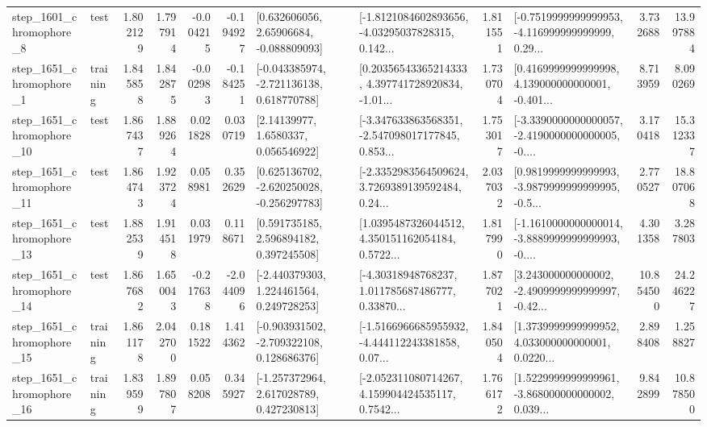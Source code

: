 \begin{tabular}{llrrrrllrlrr}
  step\_1601\_chromophore\_8 &      test &      1.802129 &    1.797914 &     -0.004215 & -0.194927 &     [0.632606056, 2.65906684, -0.088809093] &  [-1.8121084602893656, -4.03295037828315, 0.142... &       1.811551 &  [-0.7519999999999953, -4.116999999999999, 0.29... &            3.732688 &         13.997884 \\
  step\_1651\_chromophore\_1 &  training &      1.845858 &    1.842875 &     -0.002983 & -0.184251 &   [-0.043385974, -2.721136138, 0.618770788] &  [0.20356543365214333, 4.397741728920834, -1.01... &       1.730704 &  [0.4169999999999998, 4.139000000000001, -0.401... &            8.713959 &          8.090269 \\
 step\_1651\_chromophore\_10 &      test &      1.867437 &    1.889264 &      0.021828 &  0.030719 &        [2.14139977, 1.6580337, 0.056546922] &  [-3.347633863568351, -2.547098017177845, 0.853... &       1.753017 &  [-3.3390000000000057, -2.4190000000000005, -0.... &            3.170418 &         15.312337 \\
 step\_1651\_chromophore\_11 &      test &      1.864743 &    1.923724 &      0.058981 &  0.352629 &   [0.625136702, -2.620250028, -0.256297783] &  [-2.3352983564509624, 3.7269389139592484, 0.24... &       2.037032 &  [0.9819999999999993, -3.9879999999999995, -0.5... &            2.770527 &         18.807068 \\
 step\_1651\_chromophore\_13 &      test &      1.882539 &    1.914518 &      0.031979 &  0.118671 &     [0.591735185, 2.596894182, 0.397245508] &  [1.0395487326044512, 4.350151162054184, 0.5722... &       1.817990 &  [-1.1610000000000014, -3.8889999999999993, -0.... &            4.301358 &          3.287803 \\
 step\_1651\_chromophore\_14 &      test &      1.867682 &    1.650043 &     -0.217638 & -2.044096 &    [-2.440379303, 1.224461564, 0.249728253] &  [-4.30318948768237, 1.011785687486777, 0.33870... &       1.877021 &  [3.243000000000002, -2.4909999999999997, -0.42... &           10.854500 &         24.246227 \\
 step\_1651\_chromophore\_15 &  training &      1.861178 &    2.042700 &      0.181522 &  1.414362 &   [-0.903931502, -2.709322108, 0.128686376] &  [-1.5166966685955932, -4.444112243381858, 0.07... &       1.840504 &  [1.3739999999999952, 4.033000000000001, 0.0220... &            2.898408 &          1.258827 \\
 step\_1651\_chromophore\_16 &  training &      1.839599 &    1.897807 &      0.058208 &  0.345927 &    [-1.257372964, 2.617028789, 0.427230813] &  [-2.052311080714267, 4.159904424535117, 0.7542... &       1.766172 &  [1.5229999999999961, -3.868000000000002, 0.039... &            9.842899 &         10.878500 \\

\end{tabular}
